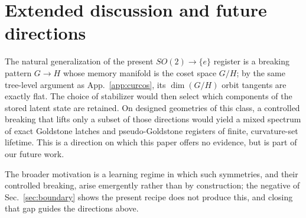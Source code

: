 \documentclass[mlabstract,onecolumn]{jmlr}
\begin{document}
\section{Extended discussion and future directions}
\label{app:exDisc}

The natural generalization of the present $SO(2)\to\{e\}$ register is a breaking pattern $G\to H$ whose memory manifold is the coset space $G/H$; by the same tree-level argument as App.~\ref{app:curcos}, its $\dim(G/H)$ orbit tangents are exactly flat. The choice of stabilizer would then select which components of the stored latent state are retained. On designed geometries of this class, a controlled breaking that lifts only a subset of those directions would yield a mixed spectrum of exact Goldstone latches and pseudo-Goldstone registers of finite, curvature-set lifetime. This is a direction on which this paper offers no evidence, but is part of our future work.

The broader motivation is a learning regime in which such symmetries, and their controlled breaking, arise emergently rather than by construction; the negative of Sec.~\ref{sec:boundary} shows the present recipe does not produce this, and closing that gap guides the directions above.
\end{document}
